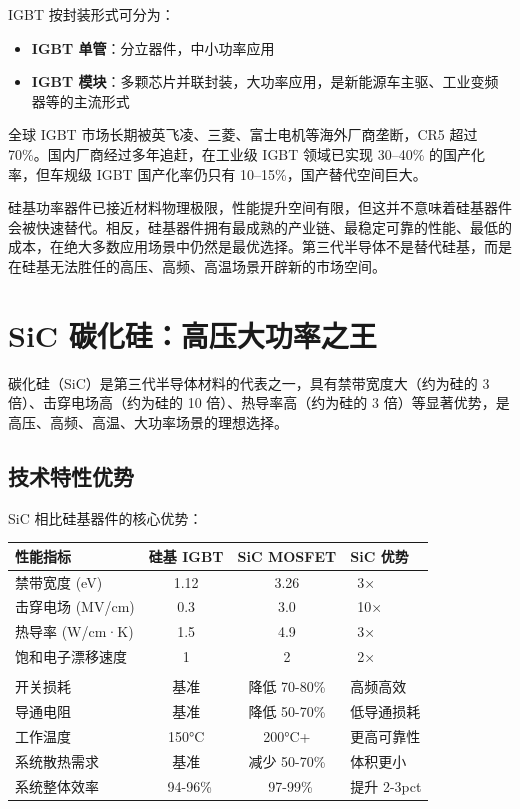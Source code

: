 IGBT 按封装形式可分为：
\begin{itemize}[leftmargin=2em]
\item \textbf{IGBT 单管}：分立器件，中小功率应用
\item \textbf{IGBT 模块}：多颗芯片并联封装，大功率应用，是新能源车主驱、工业变频器等的主流形式
\end{itemize}

全球 IGBT 市场长期被英飞凌、三菱、富士电机等海外厂商垄断，CR5 超过 70\%。国内厂商经过多年追赶，在工业级 IGBT 领域已实现 30–40\% 的国产化率，但车规级 IGBT 国产化率仍只有 10–15\%，国产替代空间巨大。

\begin{keyinsight}
硅基功率器件已接近材料物理极限，性能提升空间有限，但这并不意味着硅基器件会被快速替代。相反，硅基器件拥有最成熟的产业链、最稳定可靠的性能、最低的成本，在绝大多数应用场景中仍然是最优选择。第三代半导体不是替代硅基，而是在硅基无法胜任的高压、高频、高温场景开辟新的市场空间。
\end{keyinsight}

\section{SiC 碳化硅：高压大功率之王}

碳化硅（SiC）是第三代半导体材料的代表之一，具有禁带宽度大（约为硅的 3 倍）、击穿电场高（约为硅的 10 倍）、热导率高（约为硅的 3 倍）等显著优势，是高压、高频、高温、大功率场景的理想选择。

\subsection{技术特性优势}

SiC 相比硅基器件的核心优势：

\begin{exhibitbox}
\centering
\small
\begin{tabularx}{\textwidth}{L{3.5cm} c c X}
\toprule
\textbf{性能指标} & \textbf{硅基 IGBT} & \textbf{SiC MOSFET} & \textbf{SiC 优势} \\
\midrule
禁带宽度 (eV) & 1.12 & 3.26 & ~3× \\
击穿电场 (MV/cm) & 0.3 & 3.0 & ~10× \\
热导率 (W/cm·K) & 1.5 & 4.9 & ~3× \\
饱和电子漂移速度 & 1 & 2 & ~2× \\
\midrule
{}
 \\
开关损耗 & 基准 & 降低 70-80\% & 高频高效 \\
导通电阻 & 基准 & 降低 50-70\% & 低导通损耗 \\
工作温度 & 150°C & 200°C+ & 更高可靠性 \\
系统散热需求 & 基准 & 减少 50-70\% & 体积更小 \\
系统整体效率 & ~94-96\% & ~97-99\% & 提升 2-3pct \\
\bottomrule
\end{tabularx}
\end{exhibitbox}

